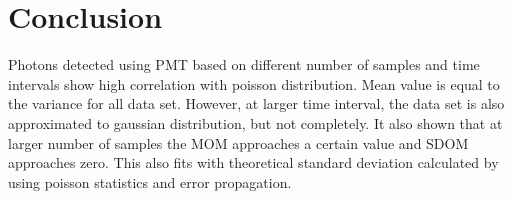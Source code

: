 \documentclass[a4paper,12pt]{article}
\begin{document}
\section{Conclusion}
Photons detected using PMT based on different number of samples and time intervals show high correlation with poisson distribution. Mean value is equal to the variance for all data set. However, at larger time interval, the data set is also approximated to gaussian distribution, but not completely. It also shown that at larger number of samples the MOM approaches a certain value and SDOM approaches zero. This also fits with theoretical standard deviation calculated by using poisson statistics and error propagation. 



\end{document}
